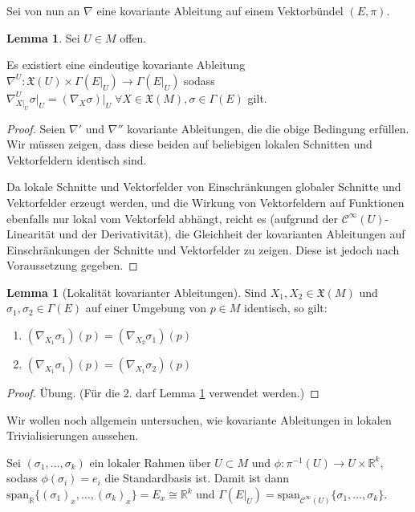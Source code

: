 \documentclass[a4paper]{scrbook}
\numberwithin{equation}{chapter}
\newcommand{\R}{\mathbb{R}}
\newcommand{\sC}{\mathcal{C}^{\infty}}
\newcommand{\vf}{\mathfrak{X}}
\theoremstyle{definition}
\newtheorem{lemma}[defn]{Lemma}
\begin{document}
		Sei von nun an $\nabla$ eine kovariante Ableitung auf einem Vektorbündel $(E,\pi)$.
		\begin{lemma}\label{lemma:Einschränkung_kovarianter_Ableitungen}
			Sei $U\in M$ offen. 
			
			Es existiert eine eindeutige kovariante Ableitung $\nabla^U\colon\vf(U)\times\Gamma(E\vert_U)\rightarrow \Gamma(E\vert_U)$ sodass $\nabla^U_{X\vert_U}\sigma\vert_U=(\nabla_X\sigma)\vert_U\; \forall X\in\vf(M),\sigma\in\Gamma(E)$ gilt.
			\begin{proof}
				Seien $\nabla'$ und $\nabla''$ kovariante Ableitungen, die die obige Bedingung erfüllen. Wir müssen zeigen, dass diese beiden auf beliebigen lokalen Schnitten und Vektorfeldern identisch sind. 
				
				Da lokale Schnitte und Vektorfelder von Einschränkungen globaler Schnitte und Vektorfelder erzeugt werden, und die Wirkung von Vektorfeldern auf Funktionen ebenfalls nur lokal vom Vektorfeld abhängt, reicht es (aufgrund der $\sC(U)$-Linearität und der Derivativität), die Gleichheit der kovarianten Ableitungen auf Einschränkungen der Schnitte und Vektorfelder zu zeigen. Diese ist jedoch nach Voraussetzung gegeben.
			\end{proof}
		\end{lemma}
		\begin{lemma}[Lokalität kovarianter Ableitungen]
			Sind $X_1,X_2\in\vf(M)$ und $\sigma_1,\sigma_2\in\Gamma(E)$ auf einer Umgebung von $p\in M$ identisch, so gilt:
			\begin{enumerate}[label=(\alph*)]
				\item $\left(\nabla_{X_1}\sigma_1\right)(p)=\left(\nabla_{X_2}\sigma_1\right)(p)$
				\item $\left(\nabla_{X_1}\sigma_1\right)(p)=\left(\nabla_{X_1}\sigma_2\right)(p)$
			\end{enumerate}
			\begin{proof}
				Übung. (Für die 2. darf Lemma \ref{lemma:Einschränkung_kovarianter_Ableitungen} verwendet werden.)
			\end{proof}
		\end{lemma}
		Wir wollen noch allgemein untersuchen, wie kovariante Ableitungen in lokalen Trivialisierungen aussehen.
		
		Sei $(\sigma_1,\ldots,\sigma_k)$ ein lokaler Rahmen über $U\subset M$ und $\phi\colon\pi^{-1}(U)\rightarrow U\times \R^k$, sodass $\phi(\sigma_i)=e_i$ die Standardbasis ist. Damit ist dann $\mathrm{span}_{\R}\lbrace (\sigma_1)_x, \ldots,(\sigma_k)_x\rbrace=E_x\cong\R^k$ und $\Gamma(E\vert_U)=\mathrm{span}_{\sC(U)}\lbrace \sigma_1,\ldots,\sigma_k\rbrace$.
		
\end{document}
